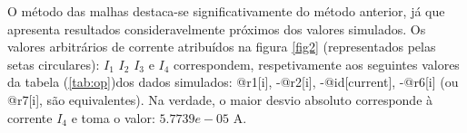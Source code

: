 O método das malhas destaca-se significativamente do método anterior, já que apresenta resultados consideravelmente próximos dos valores simulados.
Os valores arbitrários de corrente atribuídos na figura \ref{fig2} (representados pelas setas circulares): $I_1$ $I_2$ $I_3$ e $I_4$ correspondem, respetivamente aos seguintes valores da tabela (\ref{tab:op})dos dados simulados: @r1[i], -@r2[i], -@id[current], -@r6[i] (ou @r7[i], são equivalentes).
Na verdade, o maior desvio absoluto corresponde à corrente $I_4$ e toma o valor: $ 5.7739e-05 $ A.